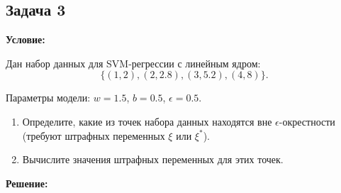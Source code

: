 \subsection{Задача 3}
\textbf{Условие:}
\par Дан набор данных для SVM-регрессии с линейным ядром: 
\begin{equation*}
    \{(1, 2), (2, 2.8), (3, 5.2), (4, 8)\}.
\end{equation*}
\par Параметры модели: \(w = 1.5\), \(b = 0.5\), \(\epsilon = 0.5\). 
\begin{enumerate}
    \item Определите, какие из точек набора данных находятся вне \(\epsilon\)-окрестности (требуют штрафных переменных \(\xi\) или \(\xi^*\)).
    \item Вычислите значения штрафных переменных для этих точек.
\end{enumerate}
\par \noindent \textbf{Решение:}
